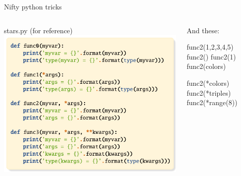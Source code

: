 \documentclass[aspectratio=169] {beamer}
\begin{document}
\begin{frame}[fragile,t]{ Nifty python tricks}

  \begin{columns}
    \begin{column}[t]{.58\textwidth}
      stars.py (for reference)
      \includegraphics[scale=.85]{stars.pdf}
    \end{column}
   
    \begin{column}[t]{.38\textwidth}
      And these:
      \begin{pythoncode}
        func2(1,2,3,4,5)
        func2()
        func2(1)
        func2(colors)
      \end{pythoncode}
  
      \pause
      \begin{pythoncode}
        func2(*colors)
        func2(*triples)
        func2(*range(8))
      \end{pythoncode}
    \end{column}
  \end{columns}

\end{frame}
\end{document}
